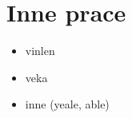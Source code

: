 \section{Inne prace}

\begin{itemize}
	\item vinlen
	\item veka
	\item inne (yeale, able)
\end{itemize}